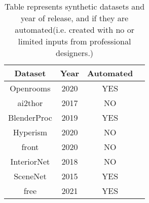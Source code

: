 \begin{table}[ht]
    \centering
    \begin{tabular}{|c |c |c |c|}
        \hline
        Dataset & Year & Automated \\ [0.5ex]
        \hline\hline
        Openrooms & 2020 & YES \\
        \hline
        \gls{ai2thor} & 2017 & NO \\
        \hline
        BlenderProc & 2019 & YES \\
        \hline
        Hyperism & 2020 & NO \\
        \hline
        \gls{front} & 2020 & NO \\
        \hline
        InteriorNet & 2018 & NO \\
        \hline
        SceneNet & 2015 & YES \\
        \hline
        \gls{free} & 2021 & YES \\[1ex]
        \hline
    \end{tabular}
    \caption{Table represents synthetic datasets and year of release, and if they are automated(i.e. created with no or limited inputs from professional designers.)}
    \label{tab:dataset_comparison}
\end{table}

